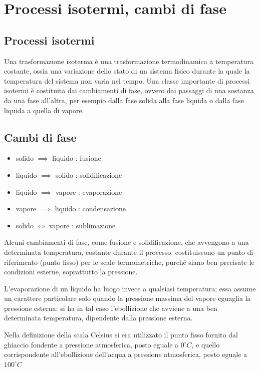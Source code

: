 \documentclass[class=book, crop=false, oneside, 12pt]{standalone}
\begin{document}
\section{Processi isotermi, cambi di fase}

\subsection{Processi isotermi}

Una trasformazione isoterma è una trasformazione termodinamica a temperatura costante, ossia una variazione dello stato di un sistema fisico durante la quale la temperatura del sistema non varia nel tempo.
Una classe importante di processi isotermi è costituita dai cambiamenti di fase, ovvero dai passaggi di una sostanza da una fase all'altra, per esempio dalla fase solida alla fase liquida o dalla fase liquida a quella di vapore.

\subsection{Cambi di fase}

\begin{itemize}
    \item solido \(\implies\) liquido : fusione
    \item liquido \(\implies\) solido : solidificazione
    \item liquido \(\implies\) vapore : evaporazione
    \item vapore \(\implies\) liquido : condensazione
    \item solido \(\iff\) vapore :  sublimazione
\end{itemize}

Alcuni cambiamenti di fase, come fusione e solidificazione, che avvengono a una determinata temperatura, costante durante il processo, costituiscono un punto di riferimento (punto fisso) per le scale termometriche, purché siano ben precisate le condizioni esterne, soprattutto la pressione.

L'evaporazione di un liquido ha luogo invece a qualsiasi temperatura; essa assume un carattere particolare solo quando la pressione massima del vapore eguaglia la pressione esterna: si ha in tal caso l'ebollizione che avviene a una ben determinata temperatura, dipendente dalla pressione esterna. 

Nella definizione della scala Celsius si era utilizzato il punto fisso fornito dal ghiaccio fondente a pressione atmosferica, posto eguale a \(0 ^{\circ} C\), e quello corrispondente all'ebollizione dell'acqua a pressione atmosferica, posto eguale a \(100 ^{\circ} C\)
\end{document}
